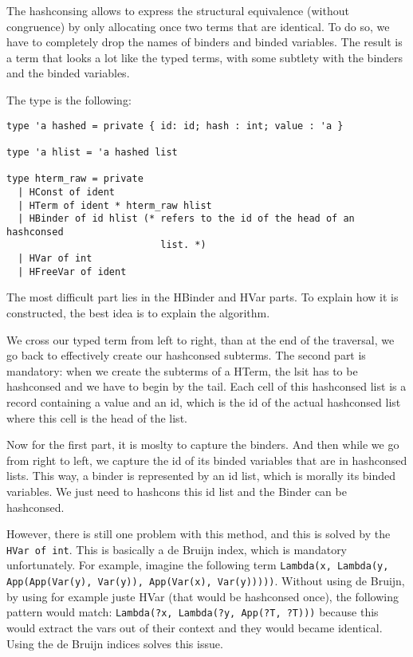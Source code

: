 The hashconsing allows to express the structural equivalence (without
congruence) by only allocating once two terms that are identical. To do so, we
have to completely drop the names of binders and binded variables. The result is
a term that looks a lot like the typed terms, with some subtlety with the
binders and the binded variables.

The type is the following:
\begin{verbatim}
type 'a hashed = private { id: id; hash : int; value : 'a }

type 'a hlist = 'a hashed list

type hterm_raw = private
  | HConst of ident
  | HTerm of ident * hterm_raw hlist
  | HBinder of id hlist (* refers to the id of the head of an hashconsed
                           list. *)
  | HVar of int
  | HFreeVar of ident
\end{verbatim}

The most difficult part lies in the HBinder and HVar parts. To explain how it is
constructed, the best idea is to explain the algorithm. 

We cross our typed term from left to right, than at the end of the traversal, we
go back to effectively create our hashconsed subterms. The second part is
mandatory: when we create the subterms of a HTerm, the lsit has to be hashconsed
and we have to begin by the tail. Each cell of this hashconsed list is a record
containing a value and an id, which is the id of the actual hashconsed list
where this cell is the head of the list.

Now for the first part, it is moslty to capture the binders. And then while we
go from right to left, we capture the id of its binded variables that are in
hashconsed lists. This way, a binder is represented by an id list, which is
morally its binded variables. We just need to hashcons this id list and the
Binder can be hashconsed.

However, there is still one problem with this method, and this is solved by the
\texttt{HVar of int}. This is basically a de Bruijn index, which is mandatory
unfortunately. For example, imagine the following term 
\texttt{Lambda(x, Lambda(y, App(App(Var(y), Var(y)), App(Var(x), Var(y)))))}.
Without using de Bruijn, by using for example juste HVar (that would be
hashconsed once), the following pattern would match: 
\texttt{Lambda(?x, Lambda(?y, App(?T, ?T)))} because this would extract the vars
out of their context and they would became identical. Using the de Bruijn
indices solves this issue.

